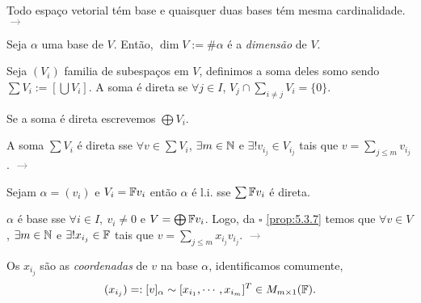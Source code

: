 \begin{theorem}
    Todo espaço vetorial tém base e quaisquer duas bases tém mesma cardinalidade. \textcolor{gray}{\(\rightarrow \) \cite[Pág. 185]{MA719}}%
\end{theorem}

\begin{definition}
    Seja \(\alpha\) uma base de \(V\). Então, \(\dim V := \# \alpha\) é a \emph{dimensão} de \(V\).  
\end{definition}

\begin{definition}
    Seja \((V_i)\) familia de subespaços em \(V\), definimos a soma deles somo sendo \(\sum V_i := \left[\bigcup V_i\right]\). A soma é direta se \(\forall j\in I\), \(V_j \cap \sum_{i\neq j} V_i =\{0\}\). 
\end{definition}

\begin{note}
    Se a soma é direta escrevemos \(\bigoplus V_i\). 
\end{note}

\begin{proposition}
    \label{prop:5.3.7}
    A soma \(\sum V_i\) é direta sse \(\forall v\in \sum V_i\), \(\exists m\in \mathbb{N} \) e \(\exists! v_{i_j} \in V_{i_j}\) tais que \(v = \sum_{j\leq m} v_{i_j}\). \textcolor{gray}{\(\rightarrow\)  \cite[Pág. 174]{MA719}} 
\end{proposition}

\begin{proposition}
    \label{prop:5.4.6}
    Sejam \(\alpha = (v_i)\) e \(V_i = \mathbb{F} v_i\) então \(\alpha\) é l.i. sse \(\sum \mathbb{F} v_i\) é direta. 
\end{proposition}

\newcommand{\comentario}[1]{\textcolor{gray}{\(\rightarrow\) #1}}

\begin{corollary}
    \(\alpha\) é base sse \(\forall i\in I,\ v_i \neq 0\) e \(V = \bigoplus \mathbb{F} v_i\). Logo, da \(\square \) \ref{prop:5.3.7} temos que \(\forall v\in V\), \(\exists m \in \mathbb{N}\) e \(\exists !x_{i_j} \in \mathbb{F}\) tais que \(v = \sum_{j\leq m } x_{i_j}v_{i_j}\). \comentario{\cite[Pág. 178]{MA719}}
\end{corollary}

\begin{note}
Os \(x_{i_j}\) são as \emph{coordenadas} de \(v\) na base \(\alpha\), identificamos comumente,  
\[(x_{i_j}) =: [v]_\alpha \sim  [ x_{i_1}, \cdots,  x_{i_m}]^T \in M_{m\times 1}(\mathbb{F}).\]
\end{note}
\- \vspace{-1.4cm}
\propositionnum{ \hspace{-0.3cm}}


